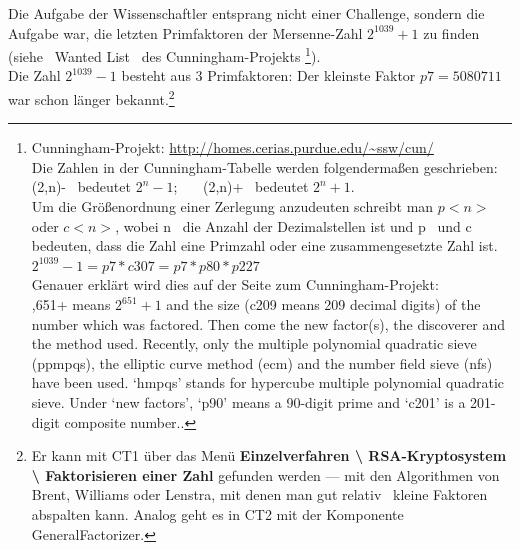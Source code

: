 \begin{refsegment}
Die Aufgabe der Wissenschaftler entsprang nicht einer Challenge, sondern
die Aufgabe war, die letzten Primfaktoren der Mersenne-Zahl $2^{1039}+1$
zu finden (siehe~ \glqq Wanted List\grqq~ des Cunningham-Projekts%
\footnote{%
Cunningham-Projekt: \url{http://homes.cerias.purdue.edu/~ssw/cun/}\\
Die Zahlen in der Cunningham-Tabelle werden folgendermaßen geschrieben:\\
\glqq (2,n)-\grqq~ bedeutet $2^{n}-1$;~~~
\glqq (2,n)+\grqq~ bedeutet $2^{n}+1$.\\
Um die Größenordnung einer Zerlegung anzudeuten schreibt man $p<n>$ oder $c<n>$,
wobei \glqq n\grqq~ die Anzahl der Dezimalstellen ist und \glqq p\grqq~ und \glqq c\grqq~
bedeuten, dass die Zahl eine Primzahl oder eine zusammengesetzte Zahl ist.\\
$2^{1039}-1 = p7 * c307 = p7 * p80 * p227$\\
Genauer erklärt wird dies auf der Seite zum Cunningham-Projekt:\\
,651+ means $2^{651} + 1$ and the size (c209 means 209 decimal digits)
of the
number which was factored.  Then come the new factor(s), the discoverer and
the method used.  Recently, only the multiple polynomial quadratic sieve
(ppmpqs), the elliptic curve method (ecm) and the number field sieve (nfs)
have been used.  `hmpqs' stands for hypercube multiple polynomial quadratic
sieve.  Under `new factors', `p90' means a 90-digit prime and `c201' is a
201-digit composite number.\grqq.
}).\\


Die Zahl $2^{1039}-1$ besteht aus 3 Primfaktoren: Der kleinste Faktor
$p7 = 5080711$ war schon länger bekannt.\footnote{%
  Er kann mit CT1 über das Menü
  {\bf Einzelverfahren \textbackslash{} RSA-Kryptosystem \textbackslash{}
  Faktorisieren einer Zahl} gefunden werden --- mit den Algorithmen von Brent,
  Williams oder Lenstra, mit denen man gut \glqq relativ\grqq~ kleine Faktoren
  abspalten kann. Analog geht es in CT2 mit der Komponente
  GeneralFactorizer.
}


\end{refsegment}
